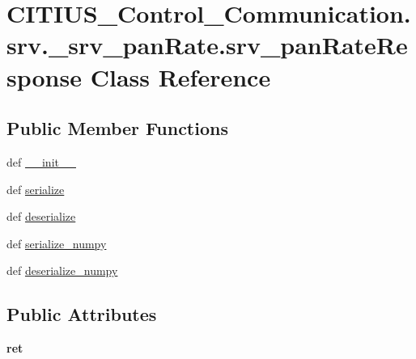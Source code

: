 \hypertarget{class_c_i_t_i_u_s___control___communication_1_1srv_1_1__srv__pan_rate_1_1srv__pan_rate_response}{\section{\-C\-I\-T\-I\-U\-S\-\_\-\-Control\-\_\-\-Communication.\-srv.\-\_\-srv\-\_\-pan\-Rate.\-srv\-\_\-pan\-Rate\-Response \-Class \-Reference}
\label{class_c_i_t_i_u_s___control___communication_1_1srv_1_1__srv__pan_rate_1_1srv__pan_rate_response}
}
\subsection*{\-Public \-Member \-Functions}
\begin{DoxyCompactItemize}
\item 
def \hyperlink{class_c_i_t_i_u_s___control___communication_1_1srv_1_1__srv__pan_rate_1_1srv__pan_rate_response_a677c8ad30f71825092c416009449c638}{\-\_\-\-\_\-init\-\_\-\-\_\-}
\item 
def \hyperlink{class_c_i_t_i_u_s___control___communication_1_1srv_1_1__srv__pan_rate_1_1srv__pan_rate_response_ad326ab5d7db11124a529436419d968cb}{serialize}
\item 
def \hyperlink{class_c_i_t_i_u_s___control___communication_1_1srv_1_1__srv__pan_rate_1_1srv__pan_rate_response_aebf27a4158ce9a0f58927441a5d01294}{deserialize}
\item 
def \hyperlink{class_c_i_t_i_u_s___control___communication_1_1srv_1_1__srv__pan_rate_1_1srv__pan_rate_response_abf263d41a43edd060fe9f2201cc3f26d}{serialize\-\_\-numpy}
\item 
def \hyperlink{class_c_i_t_i_u_s___control___communication_1_1srv_1_1__srv__pan_rate_1_1srv__pan_rate_response_a77a269e631f75ede65d068ac1dd5d206}{deserialize\-\_\-numpy}
\end{DoxyCompactItemize}
\subsection*{\-Public \-Attributes}
\begin{DoxyCompactItemize}
\item 
\hypertarget{class_c_i_t_i_u_s___control___communication_1_1srv_1_1__srv__pan_rate_1_1srv__pan_rate_response_a53fde43266621e8d9d2c07c573058c6a}{{\bfseries ret}}\label{class_c_i_t_i_u_s___control___communication_1_1srv_1_1__srv__pan_rate_1_1srv__pan_rate_response_a53fde43266621e8d9d2c07c573058c6a}

\end{DoxyCompactItemize}
